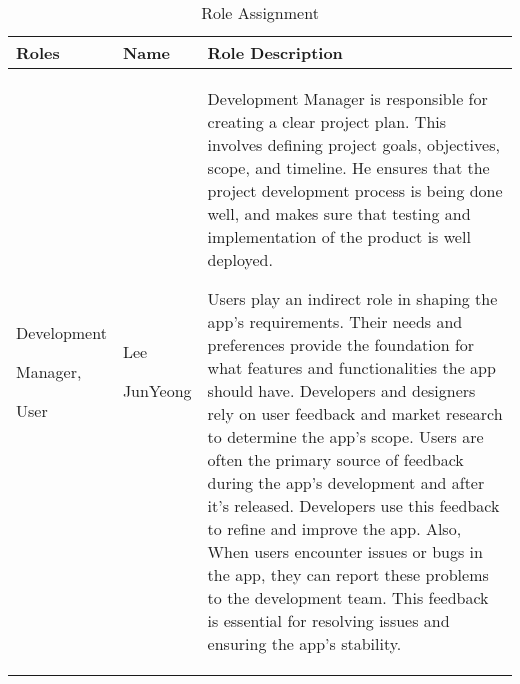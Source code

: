 \documentclass[conference]{IEEEtran}
\begin{document}
\begin{table}[h]
\caption{Role Assignment}
\begin{tabular}{| p{1.7cm}|p{1.5cm}|p{4.3cm} |}

\hline
Roles & Name & Role Description\\
\hline
Development \par Manager, \par User 
& Lee \par JunYeong 
& Development Manager is responsible for creating a clear project plan. This involves defining project goals, objectives, scope, and timeline. He ensures that the project development process is being done well, and makes sure that testing and implementation of the product is well deployed. \par
Users play an indirect role in shaping the app's requirements. Their needs and preferences provide the foundation for what features and functionalities the app should have. Developers and designers rely on user feedback and market research to determine the app's scope. Users are often the primary source of feedback during the app's development and after it's released. Developers use this feedback to refine and improve the app. Also, When users encounter issues or bugs in the app, they can report these problems to the development team. This feedback is essential for resolving issues and ensuring the app's stability.\\
\hline
\end{tabular}
\end{table}
\end{document}
